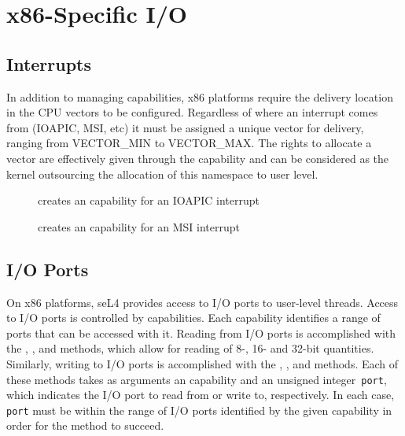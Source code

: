 \ifxeightsix
\section{x86-Specific I/O}

\subsection{Interrupts}
\label{sec:x86_interrupts}

In addition to managing  capabilities, x86 platforms require
the delivery location in the CPU vectors to be configured. Regardless of where
an interrupt comes from (IOAPIC, MSI, etc) it must be assigned a unique vector
for delivery, ranging from VECTOR\_MIN to VECTOR\_MAX. The rights to allocate
a vector are effectively given through the  capability and can
be considered as the kernel outsourcing the allocation of this namespace to
user level.

\begin{description}
    \item[] creates
    an  capability for an IOAPIC interrupt

    \item[] creates
    an  capability for an MSI interrupt
\end{description}

\subsection{I/O Ports}
\label{sec:ioports}

On x86 platforms, seL4 provides access to I/O ports to user-level threads.
Access to I/O ports is controlled by  capabilities. Each
 capability identifies a range of ports that can be accessed with
it. Reading from I/O ports is accomplished with the
,
, and
 methods, which
allow for reading of 8-, 16- and 32-bit quantities.
Similarly, writing to I/O ports is accomplished with the
,
, and
 methods.
Each of these methods takes as arguments an  capability
and an unsigned integer~\texttt{port}, which indicates the I/O port to read from
or write to, respectively.
In each case, \texttt{port} must be within the range of I/O ports identified
by the given  capability in order for the method to succeed.

